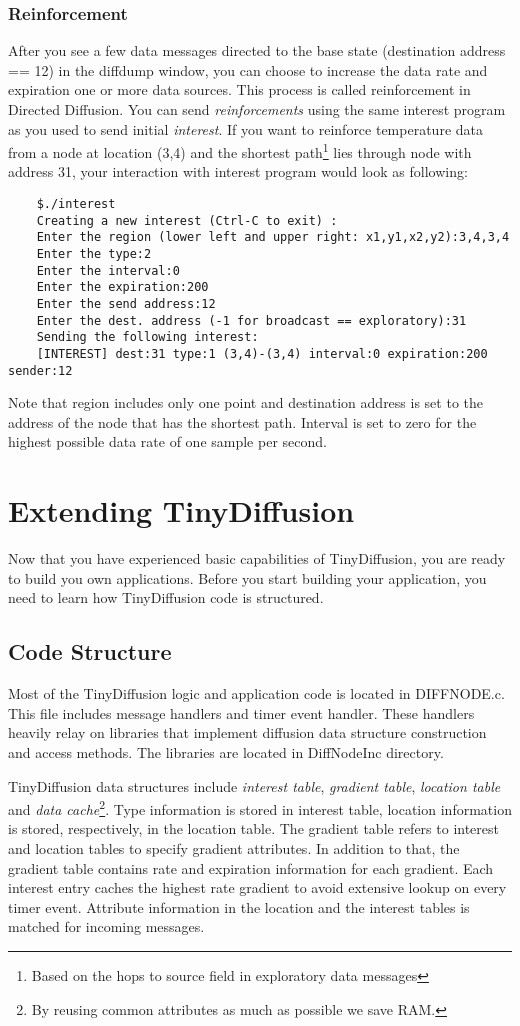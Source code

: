 \documentclass[11pt,onecolumn]{article}
\begin{document}
\subsubsection{Reinforcement}
After you see a few data messages directed to the base state
(destination address == 12) in the diffdump window, you can choose to
increase the data rate and expiration one or more data sources. This
process is called reinforcement in Directed Diffusion. You can send
\emph{reinforcements} using the same interest program as you used to
send initial \emph{interest}. If you want to reinforce temperature
data from a node at location (3,4) and the shortest
path\footnote{Based on the hops to source field in exploratory data
messages} lies through node with address 31, your interaction with
interest program would look as following:
\begin{verbatim}
	$./interest 
	Creating a new interest (Ctrl-C to exit) :
	Enter the region (lower left and upper right: x1,y1,x2,y2):3,4,3,4
	Enter the type:2
	Enter the interval:0
	Enter the expiration:200
	Enter the send address:12
	Enter the dest. address (-1 for broadcast == exploratory):31
	Sending the following interest:
	[INTEREST] dest:31 type:1 (3,4)-(3,4) interval:0 expiration:200 sender:12
\end{verbatim}
Note that region includes only one point and destination address is
set to the address of the node that has the shortest path. Interval is
set to zero for the highest possible data rate of one sample per second.

\section{Extending TinyDiffusion}
\label{extend}
Now that you have experienced basic capabilities of TinyDiffusion, you
are ready to build you own applications. Before you start building
your application, you need to learn how TinyDiffusion code is structured.

\subsection{Code Structure}
Most of the TinyDiffusion logic and application code is located in
DIFFNODE.c. This file includes message handlers and timer event
handler. These handlers heavily relay on libraries that implement
diffusion data structure construction and access methods. The
libraries are located in DiffNodeInc directory.

TinyDiffusion data structures include \emph{interest table},
\emph{gradient table}, \emph{location table} and \emph{data
cache}\footnote{By reusing common attributes as much as possible we
save RAM.}. Type information is stored in interest table, location
information is stored, respectively, in the location table. The
gradient table refers to interest and location tables to specify
gradient attributes. In addition to that, the gradient table contains
rate and expiration information for each gradient. Each interest entry
caches the highest rate gradient to avoid extensive lookup on every
timer event.  Attribute information in the location and the interest
tables is matched for incoming messages.
\end{document}
